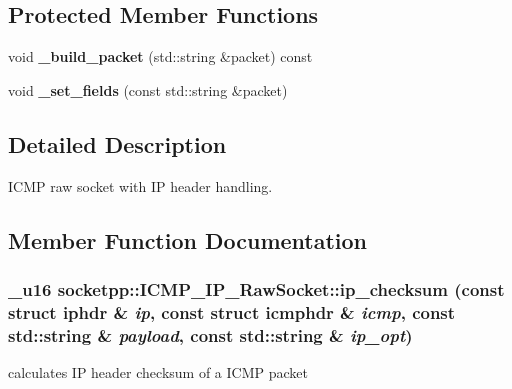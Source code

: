\subsection*{Protected Member Functions}
\begin{CompactItemize}
\item 
\hypertarget{classsocketpp_1_1ICMP__IP__RawSocket_ccfc4205717c474435dcf7e2603d1200}{
void \textbf{\_\-build\_\-packet} (std::string \&packet) const }
\label{classsocketpp_1_1ICMP__IP__RawSocket_ccfc4205717c474435dcf7e2603d1200}

\item 
\hypertarget{classsocketpp_1_1ICMP__IP__RawSocket_6d2f188d46030afa13f9c3971d43d518}{
void \textbf{\_\-set\_\-fields} (const std::string \&packet)}
\label{classsocketpp_1_1ICMP__IP__RawSocket_6d2f188d46030afa13f9c3971d43d518}

\end{CompactItemize}


\subsection{Detailed Description}
ICMP raw socket with IP header handling. 

\subsection{Member Function Documentation}
\hypertarget{classsocketpp_1_1ICMP__IP__RawSocket_0723a72dc06b401f6dd101a25da6348f}{
\subsubsection[{ip\_\-checksum}]{\setlength{\rightskip}{0pt plus 5cm}\_\-u16 socketpp::ICMP\_\-IP\_\-RawSocket::ip\_\-checksum (const struct iphdr \& {\em ip}, \/  const struct icmphdr \& {\em icmp}, \/  const std::string \& {\em payload}, \/  const std::string \& {\em ip\_\-opt})}}
\label{classsocketpp_1_1ICMP__IP__RawSocket_0723a72dc06b401f6dd101a25da6348f}


calculates IP header checksum of a ICMP packet 

